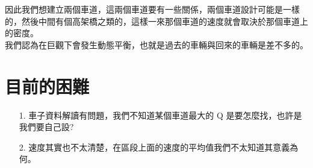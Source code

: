 \documentclass[a4paper, 11pt]{report}
\begin{document}
因此我們想建立兩個車道，這兩個車道要有一些關係，兩個車道設計可能是一樣的，然後中間有個高架橋之類的，這樣一來那個車道的速度就會取決於那個車道上的密度。\\

我們認為在巨觀下會發生動態平衡，也就是過去的車輛與回來的車輛是差不多的。

\section{目前的困難}

\begin{itemize}
\item[1.] 車子資料解讀有問題，我們不知道某個車道最大的 Q 是要怎麼找，也許是我們要自己設?\\

\item[2.] 速度其實也不太清楚，在區段上面的速度的平均值我們不太知道其意義為何。
\end{itemize}

\renewcommand{\bibname}{References}


\end{document}
